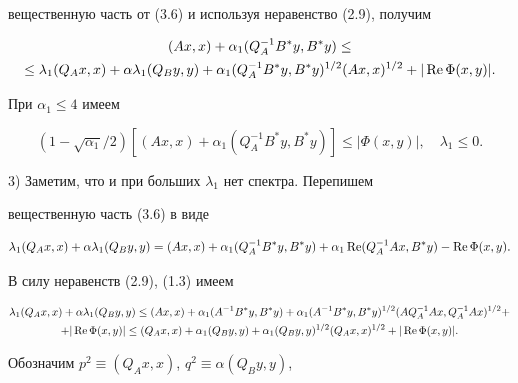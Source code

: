 \begin{pf}
вещественную часть от (3.6) и используя неравенство (2.9), получим 


\begin{multline} 


(Ax,x)+\alpha_1(Q^{-1}_A B^*y,B^*y)\le \\ 


% 


\le\lambda_1(Q_A x,x)+\alpha\lambda_1(Q_B y,y)+ 


\alpha_1(Q^{-1}_A B^*y,B^*y)^{1/2}(Ax,x)^{1/2}+ 


|\re\Phi(x,y)|. 


\end{multline} 


При $\alpha_1\le4$ имеем 


$$ 


(1-\sqrt{\alpha_1}/2)[(Ax,x)+\alpha_1(Q^{-1}_A B^*y,B^*y)] 


\le|\Phi(x,y)|,\quad \lambda_1\le0. 


$$ 


 


3) Заметим, что и при больших $\lambda_1$ нет спектра. Перепишем 


вещественную часть (3.6) в виде 


$$ 


\lambda_1(Q_A x,x)+\alpha\lambda_1(Q_B y,y)=(Ax,x)+\alpha_1 


(Q^{-1}_A B^*y,B^*y)+\alpha_1\re(Q^{-1}_A Ax,B^*y)- 


\re\Phi(x,y). 


$$ 


В силу неравенств (2.9), (1.3) имеем 


\begin{multline*} 


\lambda_1(Q_A x,x)+\alpha\lambda_1(Q_B y,y)\le (Ax,x)+\alpha_1 


(A^{-1}B^*y,B^*y)+\alpha_1(A^{-1}B^*y,B^*y)^{1/2} 


(A Q^{-1}_A Ax,Q^{-1}_A Ax)^{1/2} +\\ 


% 


+|\re\Phi(x,y)|\le(Q_A x,x)+\alpha_1(Q_B y,y)+\alpha_1 


(Q_B y,y)^{1/2}(Q_A x,x)^{1/2}+|\re\Phi(x,y)|. 


\end{multline*} 


Обозначим $p^2\equiv(Q_A x,x)$, $q^2\equiv\alpha(Q_B y,y)$, 



\end{pf}
